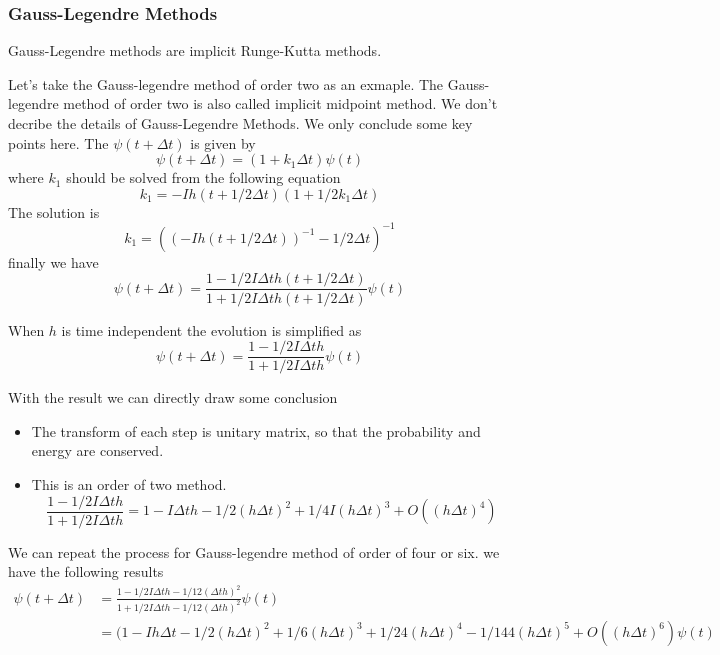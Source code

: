 \documentclass[12pt,twoside]{article}
\begin{document}
\subsubsection{Gauss-Legendre Methods}

Gauss-Legendre methods are implicit Runge-Kutta methods.

Let's take the Gauss-legendre method of order two as an exmaple. The Gauss-legendre method of order two is also called implicit midpoint method.
We don't decribe the details of Gauss-Legendre Methods. We only conclude some key points here.
The $\psi(t+\Delta t)$ is given by
$$
\psi(t+\Delta t) = (1+k_1\Delta t) \psi(t)
$$
where $k_1$ should be solved from the following equation
$$
k_1 = - I h(t+1/2\Delta t) (1 + 1/2 k_1\Delta t)
$$
The solution is
$$
k_1 = ((-I h(t+1/2\Delta t))^{-1} - 1/2 \Delta t)^{-1}
$$
finally we have
$$
\psi(t+\Delta t) = \frac{1 - 1/2 I \Delta t h(t+1/2\Delta t)} {1 + 1/2 I \Delta t h(t+1/2\Delta t)} \psi(t)
$$

When $h$ is time independent the evolution is simplified as
$$
\psi(t + \Delta t) = \frac{1 - 1/2 I \Delta t h} {1 + 1/2 I \Delta t h} \psi(t)
$$

With the result we can directly draw some conclusion

\begin{itemize}
  \item The transform of each step is unitary matrix, so that the probability and energy are conserved.
  \item This is an order of two method.
$$
\frac{1 - 1/2 I \Delta t h} {1 + 1/2 I \Delta t h}
= 1- I \Delta t h - 1/2(h\Delta t)^2+ 1/4 I(h\Delta t)^3 + O((h\Delta t)^4)
$$
\end{itemize}

We can repeat the process for Gauss-legendre method of order of four or six. we have the following results
\begin{align*}
\psi(t + \Delta t) &= \frac{1 - 1/2 I \Delta t h - 1/12 (\Delta t h)^2}{ 1 + 1/2 I \Delta t h - 1/12 (\Delta t h)^2} \psi(t)\\
&=(1 - I h \Delta t - 1/2 (h \Delta t)^2 + 1/6 (h \Delta t)^3 + 1/24(h \Delta t)^4 - 1/144(h \Delta t)^5 + O((h \Delta t)^6)\psi(t)
\end{align*}
\end{document}
